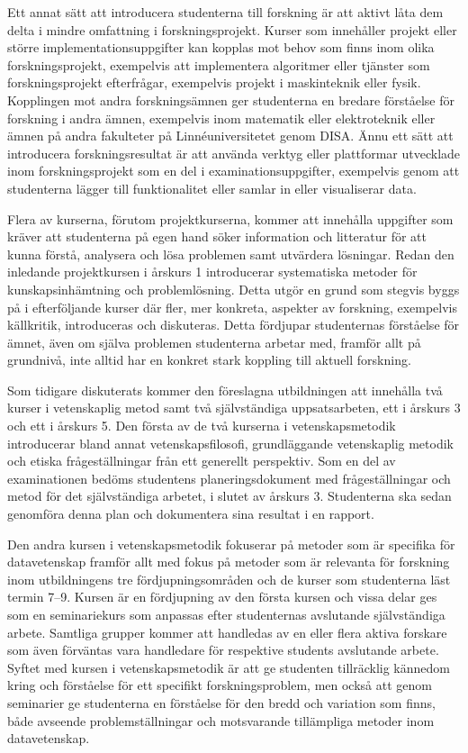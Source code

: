 Ett annat sätt att introducera studenterna till forskning är att aktivt låta dem delta i mindre omfattning i forskningsprojekt. Kurser som innehåller projekt eller större implementationsuppgifter kan kopplas mot behov som finns inom olika forskningsprojekt, exempelvis att implementera algoritmer eller tjänster som forskningsprojekt efterfrågar, exempelvis projekt i maskinteknik eller fysik. Kopplingen mot andra forskningsämnen ger studenterna en bredare förståelse för forskning i andra ämnen, exempelvis inom matematik eller elektroteknik eller ämnen på andra fakulteter på Linnéuniversitetet genom DISA. Ännu ett sätt att introducera forskningsresultat är att använda verktyg eller plattformar utvecklade inom forskningsprojekt som en del i examinationsuppgifter, exempelvis genom att studenterna lägger till funktionalitet eller samlar in eller visualiserar data.

Flera av kurserna, förutom projektkurserna, kommer att innehålla uppgifter som kräver att studenterna på egen hand söker information och litteratur för att kunna förstå, analysera och lösa problemen samt utvärdera lösningar. Redan den inledande projektkursen i årskurs 1 introducerar systematiska metoder för kunskapsinhämtning och problemlösning. Detta utgör en grund som stegvis byggs på i efterföljande kurser där fler, mer konkreta, aspekter av forskning, exempelvis källkritik, introduceras och diskuteras. Detta fördjupar studenternas förståelse för ämnet, även om själva problemen studenterna arbetar med, framför allt på grundnivå, inte alltid har en konkret stark koppling till aktuell forskning.

Som tidigare diskuterats kommer den föreslagna utbildningen att innehålla två kurser i vetenskaplig metod samt två självständiga uppsatsarbeten, ett i årskurs 3 och ett i årskurs 5. Den första av de två kurserna i vetenskapsmetodik introducerar bland annat vetenskapsfilosofi, grundläggande vetenskaplig metodik och etiska frågeställningar från ett generellt perspektiv. Som en del av examinationen bedöms studentens planeringsdokument med frågeställningar och metod för det självständiga arbetet, i slutet av årskurs 3. Studenterna ska sedan genomföra denna plan och dokumentera sina resultat i en rapport.

Den andra kursen i vetenskapsmetodik fokuserar på metoder som är specifika för datavetenskap framför allt med fokus på metoder som är relevanta för forskning inom utbildningens tre fördjupningsområden och de kurser som studenterna läst termin 7--9. Kursen är en fördjupning av den första kursen och vissa delar ges som en seminariekurs som anpassas efter studenternas avslutande självständiga arbete. Samtliga grupper kommer att handledas av en eller flera aktiva forskare som även förväntas vara handledare för respektive students avslutande arbete. Syftet med kursen i vetenskapsmetodik är att ge studenten tillräcklig kännedom kring och förståelse för ett specifikt forskningsproblem, men också att genom seminarier ge studenterna en förståelse för den bredd och variation som finns, både avseende problemställningar och motsvarande tillämpliga metoder inom datavetenskap.

